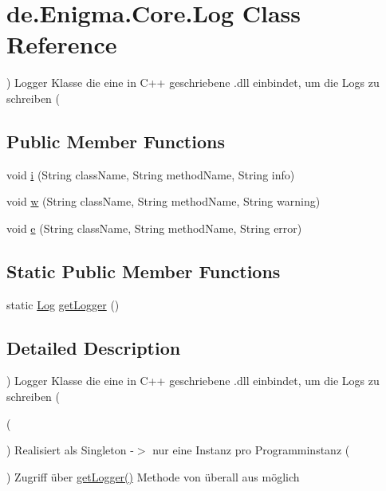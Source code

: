 \hypertarget{classde_1_1_enigma_1_1_core_1_1_log}{}\section{de.\+Enigma.\+Core.\+Log Class Reference}
\label{classde_1_1_enigma_1_1_core_1_1_log}


) Logger Klasse die eine in C++ geschriebene .dll einbindet, um die Logs zu schreiben (  


\subsection*{Public Member Functions}
\begin{DoxyCompactItemize}
\item 
void \hyperlink{classde_1_1_enigma_1_1_core_1_1_log_a98177adb81490a58cdb21b365e71f290}{i} (String class\+Name, String method\+Name, String info)
\item 
void \hyperlink{classde_1_1_enigma_1_1_core_1_1_log_a2c72582bc2dd2fd464f5a4cb7109f894}{w} (String class\+Name, String method\+Name, String warning)
\item 
void \hyperlink{classde_1_1_enigma_1_1_core_1_1_log_a402f5a4a3b918b178cf711f02eb6f67a}{e} (String class\+Name, String method\+Name, String error)
\end{DoxyCompactItemize}
\subsection*{Static Public Member Functions}
\begin{DoxyCompactItemize}
\item 
static \hyperlink{classde_1_1_enigma_1_1_core_1_1_log}{Log} \hyperlink{classde_1_1_enigma_1_1_core_1_1_log_a06d2a4076d1150b2743351602fbfbc82}{get\+Logger} ()
\end{DoxyCompactItemize}


\subsection{Detailed Description}
) Logger Klasse die eine in C++ geschriebene .dll einbindet, um die Logs zu schreiben ( 

(

) Realisiert als Singleton -\/$>$ nur eine Instanz pro Programminstanz (

) Zugriff über \hyperlink{classde_1_1_enigma_1_1_core_1_1_log_a06d2a4076d1150b2743351602fbfbc82}{get\+Logger()} Methode von überall aus möglich

